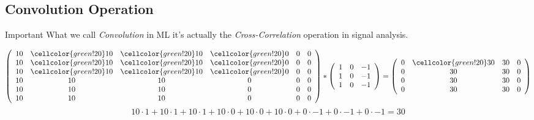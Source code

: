 \subsection{Convolution Operation}
\begin{frame}{\insertsubsec}
    \begin{alertblock}{Important}
        What we call \textit{Convolution} in ML it's actually the \textit{Cross-Correlation} operation
        in signal analysis.
    \end{alertblock}
    
    \begin{align*}
        \left(
        \begin{array}{cccccc}
            10 & \cellcolor{green!20}10 & \cellcolor{green!20}10 & \cellcolor{green!20}0 & 0 & 0 \\
            10 & \cellcolor{green!20}10 & \cellcolor{green!20}10 & \cellcolor{green!20}0 & 0 & 0 \\
            10 & \cellcolor{green!20}10 & \cellcolor{green!20}10 & \cellcolor{green!20}0 & 0 & 0 \\
            10 & 10 & 10 & 0 & 0 & 0 \\
            10 & 10 & 10 & 0 & 0 & 0 \\
            10 & 10 & 10 & 0 & 0 & 0 \\
        \end{array}
        \right)
        *
        \left(
        \begin{array}{ccc}
            1 & 0 & -1 \\
            1 & 0 & -1 \\ 
            1 & 0 & -1 \\
        \end{array}
        \right)
        = 
        \left(
        \begin{array}{cccc}
            0 & \cellcolor{green!20}30 & 30 & 0 \\
            0 & 30 & 30 & 0 \\
            0 & 30 & 30 & 0 \\
            0 & 30 & 30 & 0 \\
        \end{array}
        \right)
    \end{align*}
    $$
        10 \cdot 1 + 10 \cdot 1 + 10 \cdot 1 +
        10 \cdot 0 + 10 \cdot 0 + 10 \cdot 0 +
        0 \cdot -1 + 0 \cdot -1 + 0 \cdot -1 = 30
    $$
\end{frame}

